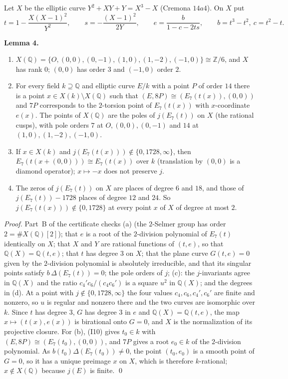 \documentclass[11pt]{article}
\newenvironment{statement}[1]{\par\medskip\noindent\phantomsection\textbf{#1}\ }{\par\medskip}
\newcommand{\Q}{\mathbb Q}
\newcommand{\Z}{\mathbb Z}
\begin{document}
Let \(X\) be the elliptic curve \(Y^2+XY+Y=X^3-X\) (Cremona \(14a4\)). On \(X\) put
\[t=1-\frac{X(X-1)^2}{Y^2},\qquad s=-\frac{(X-1)^2}{2Y},\qquad e=\frac{b}{1-c-2ts},\qquad b=t^3-t^2,\ c=t^2-t .\]

\begin{statement}{Lemma 4.}\label{lemma-model}
\begin{enumerate}
\item[(a)] \(X(\Q)=\{O,(0,0),(0,-1),(1,0),(1,-2),(-1,0)\}\cong\Z/6\), and \(X\) has rank \(0\); \((0,0)\) has order
\(3\) and \((-1,0)\) order \(2\).
\item[(b)] For every field \(k\supseteq\Q\) and elliptic curve \(E/k\) with a point \(P\) of order \(14\) there is a
point \(x\in X(k)\setminus X(\Q)\) such that \((E,8P)\cong(E_7(t(x)),(0,0))\) and \(7P\) corresponds to the
\(2\)-torsion point of \(E_7(t(x))\) with \(x\)-coordinate \(e(x)\). The points of \(X(\Q)\) are the poles of
\(j(E_7(t))\) on \(X\) (the rational cusps), with pole orders \(7\) at \(O,(0,0),(0,-1)\) and \(14\) at
\((1,0),(1,-2),(-1,0)\).
\item[(c)] If \(x\in X(k)\) and \(j(E_7(t(x)))\notin\{0,1728,\infty\}\), then \(E_7(t(x+(0,0)))\cong E_7(t(x))\)
over \(k\) (translation by \((0,0)\) is a diamond operator); \(x\mapsto-x\) does not preserve \(j\).
\item[(d)] The zeros of \(j(E_7(t))\) on \(X\) are places of degree \(6\) and \(18\), and those of
\(j(E_7(t))-1728\) places of degree \(12\) and \(24\). So \(j(E_7(t(x)))\notin\{0,1728\}\) at every point \(x\) of
\(X\) of degree at most \(2\).
\end{enumerate}
\end{statement}

\emph{Proof.} Part~B of the certificate checks (a) (the \(2\)-Selmer group has order \(2=\#X(\Q)[2]\)); that \(e\)
is a root of the \(2\)-division polynomial of \(E_7(t)\) identically on \(X\); that \(X\) and \(Y\) are rational
functions of \((t,e)\), so that \(\Q(X)=\Q(t,e)\); that \(t\) has degree \(3\) on \(X\); that the plane curve
\(G(t,e)=0\) given by the \(2\)-division polynomial is absolutely irreducible, and that its singular points satisfy
\(b\,\Delta(E_7(t))=0\); the pole orders of \(j\); (c): the \(j\)-invariants agree in \(\Q(X)\) and the ratio
\(c_4'c_6/(c_4c_6')\) is a square \(u^2\) in \(\Q(X)\); and the degrees in (d). At a point with
\(j\notin\{0,1728,\infty\}\) the four values \(c_4,c_6,c_4',c_6'\) are finite and nonzero, so \(u\) is regular and
nonzero there and the two curves are isomorphic over \(k\). Since \(t\) has degree \(3\), \(G\) has degree \(3\) in
\(e\) and \(\Q(X)=\Q(t,e)\), the map \(x\mapsto(t(x),e(x))\) is birational onto \(G=0\), and \(X\) is the
normalization of its projective closure. For (b), (I10) gives \(t_0\in k\) with \((E,8P)\cong(E_7(t_0),(0,0))\),
and \(7P\) gives a root \(e_0\in k\) of the \(2\)-division polynomial. As \(b(t_0)\Delta(E_7(t_0))\ne0\), the point
\((t_0,e_0)\) is a smooth point of \(G=0\), so it has a unique preimage \(x\) on \(X\), which is therefore
\(k\)-rational; \(x\notin X(\Q)\) because \(j(E)\) is finite. \qed
\end{document}
